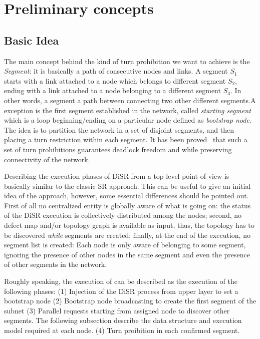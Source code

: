 
\section{Preliminary concepts}
\label{sec:disr_concepts}

\subsection{Basic Idea}
The main concept behind the kind of turn prohibition we want to
achieve is the \emph{Segment}: it is basically a path of consecutive
nodes and links. A segment $S_1$ starts with a link attached to a node which
belongs to different segment $S_2$, ending with a link attached to a
node belonging to a different segment $S_3$. In other words, a segment
a path between connecting two other different segments.A exception is
the first segment established in the network, called \emph{starting
segment} which is  a loop beginning/ending on a particular node
defined as \emph{bootstrap node}.
The idea is to partition the network in a set of disjoint segments, and then
placing a turn restriction within each segment. It has been proved~\cite{mejia_ipdps06}
that such a set of turn prohibitions guarantees deadlock freedom and
while preserving connectivity of the network.

Describing the execution phases of DiSR from a top level point-of-view
is basically similar to the classic SR approach. This can be useful to
give an initial idea of the approach, however, some essential
differences should be pointed out. First of all no centralized entity is
globally aware of what is going on: the status of the DiSR execution
is collectively distributed among the nodes; second, no defect map and/or
topology graph is available as input, thus, the topology has to be
discovered \emph{while} segments are created; finally, at the end of the
execution, no segment list is created: Each node is only aware of
belonging to some segment, ignoring the presence of other nodes
in the same segment and even the presence of other segments in the
network.

Roughly speaking, the execution of can be described as the execution
of the following phases: (1) Injection of the DiSR process from upper layer to set a bootstrap
node (2) Bootstrap node broadcasting to create the first segment of the subnet
(3) Parallel requests starting from assigned node to discover other
segments. The following subsection describe the data structure and
execution model required at each node. (4) Turn proibition in each
confirmed segment.

